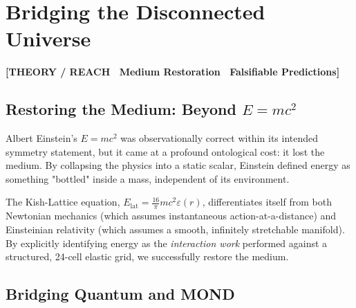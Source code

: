 \documentclass[11pt, letterpaper, openany]{book}
\begin{document}
\begin{center}
\end{center}

\chapter{Bridging the Disconnected Universe}

\begin{center}
{\color{theorytag}\textbf{[THEORY / REACH \textbullet\ Medium Restoration \textbullet\ Falsifiable Predictions]}}
\end{center}

\section{Restoring the Medium: Beyond $E=mc^2$}

Albert Einstein's $E=mc^2$ was observationally correct within its intended symmetry statement, but it came at a profound ontological cost: it lost the medium. By collapsing the physics into a static scalar, Einstein defined energy as something "bottled" inside a mass, independent of its environment. 

The Kish-Lattice equation, $E_{\mathrm{lat}} = \frac{16}{\pi}mc^2 \varepsilon(r)$, differentiates itself from both Newtonian mechanics (which assumes instantaneous action-at-a-distance) and Einsteinian relativity (which assumes a smooth, infinitely stretchable manifold). By explicitly identifying energy as the \textit{interaction work} performed against a structured, 24-cell elastic grid, we successfully restore the medium. 

\section{Bridging Quantum and MOND}
\end{document}
